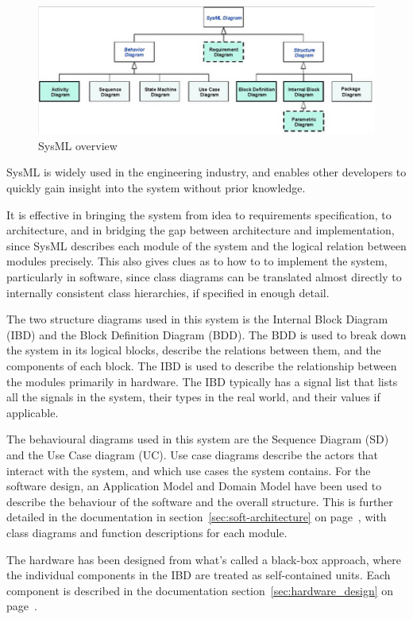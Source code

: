 \begin{figure}[H]
	\centering
	\includegraphics[max width=1\linewidth]{SysML.png}
	\caption{SysML overview\cite{SysML}}
	\label{fig:SysML}
\end{figure}

SysML is widely used in the engineering industry, and enables other developers to quickly gain insight into the system without prior knowledge. 

It is effective in bringing the system from idea to requirements specification, to architecture, and in bridging the gap between architecture and implementation, since SysML describes each module of the system and the logical relation between modules precisely. This also gives clues as to how to to implement the system, particularly in software, since class diagrams can be translated almost directly to internally consistent class hierarchies, if specified in enough detail.

The two structure diagrams used in this system is the Internal Block Diagram (IBD) and the Block Definition Diagram (BDD). The BDD is used to break down the system in its logical blocks, describe the relations between them, and the components of each block. The IBD is used to describe the relationship between the modules primarily in hardware. The IBD typically has a signal list that lists all the signals in the system, their types in the real world, and their values if applicable.

The behavioural diagrams used in this system are the Sequence Diagram (SD) and the Use Case diagram (UC). Use case diagrams describe the actors that interact with the system, and which use cases the system contains. For the software design, an Application Model and Domain Model have been used to describe the behaviour of the software and the overall structure. This is further detailed in the documentation in section~\ref{sec:soft-architecture} on page~\pageref{sec:soft-architecture}, with class diagrams and function descriptions for each module.

The hardware has been designed from what's called a black-box approach, where the individual components in the IBD are treated as self-contained units. Each component is described in the documentation section~\ref{sec:hardware_design} on page~\pageref{sec:hardware_design}.



